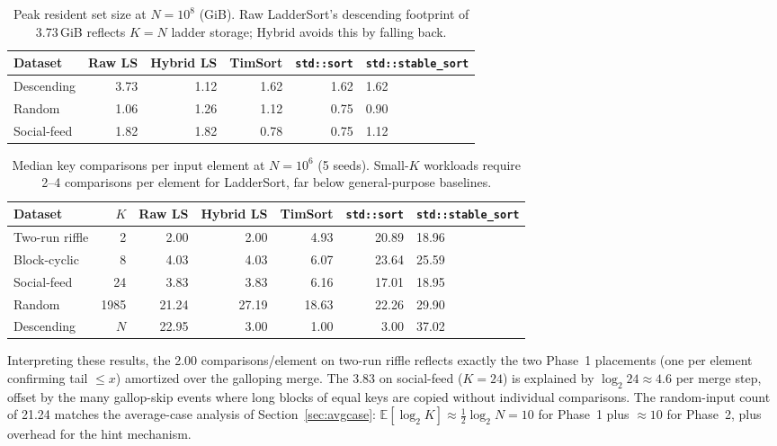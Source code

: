 \documentclass{ieeeaccess}
\theoremstyle{plain}
\theoremstyle{definition}
\begin{document}
\begin{table}[t]
\centering\small
\caption{Peak resident set size at $N=10^8$ (GiB). Raw LadderSort's
  descending footprint of 3.73\,GiB reflects $K=N$ ladder storage; Hybrid
  avoids this by falling back.}
\label{tab:phase5-memory}
\begin{tabularx}{\linewidth}{@{}lrrrrX@{}}
\toprule
Dataset & Raw LS & Hybrid LS & TimSort & \texttt{std::sort} & \texttt{std::stable\_sort} \\
\midrule
Descending  & 3.73 & 1.12 & 1.62 & 1.62 & 1.62 \\
Random      & 1.06 & 1.26 & 1.12 & 0.75 & 0.90 \\
Social-feed & 1.82 & 1.82 & 0.78 & 0.75 & 1.12 \\
\bottomrule
\end{tabularx}
\end{table}

\begin{table}[t]
\centering\small
\caption{Median key comparisons per input element at $N=10^6$ (5 seeds).
  Small-$K$ workloads require 2--4 comparisons per element for LadderSort,
  far below general-purpose baselines.}
\label{tab:phase5-comparisons}
\begin{tabularx}{\linewidth}{@{}lrrrrrX@{}}
\toprule
Dataset & $K$ & Raw LS & Hybrid LS & TimSort & \texttt{std::sort} & \texttt{std::stable\_sort} \\
\midrule
Two-run riffle & 2    & 2.00  & 2.00  & 4.93  & 20.89 & 18.96 \\
Block-cyclic   & 8    & 4.03  & 4.03  & 6.07  & 23.64 & 25.59 \\
Social-feed    & 24   & 3.83  & 3.83  & 6.16  & 17.01 & 18.95 \\
Random         & 1985 & 21.24 & 27.19 & 18.63 & 22.26 & 29.90 \\
Descending     & $N$  & 22.95 & 3.00  & 1.00  & 3.00  & 37.02 \\
\bottomrule
\end{tabularx}
\end{table}

Interpreting these results, the 2.00 comparisons/element on two-run riffle reflects exactly the two Phase~1 placements (one per element confirming tail $\le x$) amortized over the galloping merge.  The 3.83 on social-feed ($K=24$) is explained by $\log_2 24 \approx 4.6$ per merge step, offset by the many gallop-skip
events where long blocks of equal keys are copied without individual comparisons.  The random-input count of 21.24 matches the average-case analysis of Section~\ref{sec:avgcase}: $\mathbb{E}[\log_2 K] \approx \frac{1}{2}\log_2 N = 10$ for Phase~1 plus $\approx 10$ for Phase~2, plus overhead for the hint mechanism.
\end{document}
